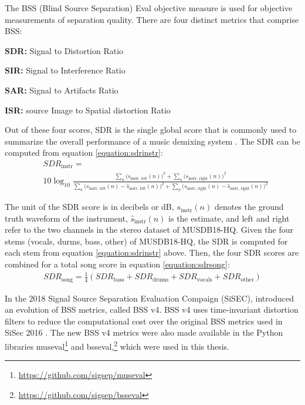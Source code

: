 \documentclass[report.tex]{subfiles}
\begin{document}

The BSS (Blind Source Separation) Eval \parencite{bss, bss2} objective measure is used for objective measurements of separation quality. There are four distinct metrics that comprise BSS:

\begin{tight_itemize}
\item
	\textbf{SDR:} Signal to Distortion Ratio
\item
	\textbf{SIR:} Signal to Interference Ratio
\item
	\textbf{SAR:} Signal to Artifacts Ratio
\item
	\textbf{ISR:} source Image to Spatial distortion Ratio
\end{tight_itemize}

Out of these four scores, SDR is the single global score that is commonly used to summarize the overall performance of a music demixing system \parencite{sdruseful}. The SDR can be computed from equation \eqref{equation:sdrinstr}:
\begin{align}
	\nonumber & \mathit{SDR}_{\text{instr}} = \\
	&10 \log_{10}\frac{\sum_{n}\big(s_{\text{instr, left}}(n)\big)^{2} + \sum_{n}\big(s_{\text{instr, right}}(n)\big)^{2}}{\sum_{n}\big(s_{\text{instr, left}}(n) - \hat{s}_{\text{instr, left}}(n)\big)^{2} + \sum_{n}\big(s_{\text{instr, right}}(n) - \hat{s}_{\text{instr, right}}(n)\big)^{2}} \tag{22}\label{equation:sdrinstr}
\end{align}

The unit of the SDR score is in decibels or dB, $s_{\text{instr}}(n)$ denotes the ground truth waveform of the instrument, $\hat{s}_{\text{instr}}(n)$ is the estimate, and left and right refer to the two channels in the stereo dataset of MUSDB18-HQ. Given the four stems (vocals, durms, bass, other) of MUSDB18-HQ, the SDR is computed for each stem from equation \eqref{equation:sdrinstr} above. Then, the four SDR scores are combined for a total song score in equation \eqref{equation:sdrsong}:
\begin{align}
	\mathit{SDR}_{\text{song}} = \frac{1}{4}(\mathit{SDR}_{\text{bass}} + \mathit{SDR}_{\text{drums}} + \mathit{SDR}_{\text{vocals}} + \mathit{SDR}_{\text{other}}) \tag{23}\label{equation:sdrsong}
\end{align}

In the 2018 Signal Source Separation Evaluation Compaign (SiSEC), \textcite{sisec2018} introduced an evolution of BSS metrics, called BSS v4. BSS v4 uses time-invariant distortion filters to reduce the computational cost over the original BSS metrics used in SiSec 2016 \parencite{sisec2016}. The new BSS v4 metrics were also made available in the Python libraries museval\footnote{\url{https://github.com/sigsep/museval}} and bsseval,\footnote{\url{https://github.com/sigsep/bsseval}} which were used in this thesis.
\end{document}
